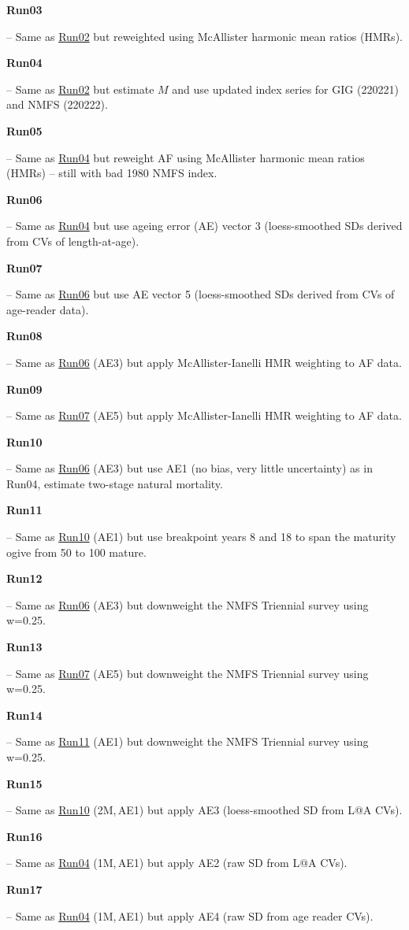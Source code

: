\hypertarget{R03}{\textbf{Run03}} -- Same as \hyperlink{R02}{Run02} but reweighted using McAllister harmonic mean ratios (HMRs).

\hypertarget{R04}{\textbf{Run04}} -- Same as \hyperlink{R02}{Run02} but estimate $M$ and use updated index series for GIG (220221) and NMFS (220222).

\hypertarget{R05}{\textbf{Run05}} -- Same as \hyperlink{R04}{Run04} but reweight AF using McAllister harmonic mean ratios (HMRs) -- still with bad 1980 NMFS index.

\hypertarget{R06}{\textbf{Run06}} -- Same as \hyperlink{R04}{Run04} but  use ageing error (AE) vector 3 (loess-smoothed SDs derived from CVs of length-at-age).

\hypertarget{R07}{\textbf{Run07}} -- Same as \hyperlink{R06}{Run06} but use AE vector 5 (loess-smoothed SDs derived from CVs of age-reader data).

\hypertarget{R08}{\textbf{Run08}} -- Same as \hyperlink{R06}{Run06} (AE3) but apply McAllister-Ianelli HMR weighting to AF data.

\hypertarget{R09}{\textbf{Run09}} -- Same as \hyperlink{R07}{Run07} (AE5) but apply McAllister-Ianelli HMR weighting to AF data.

\hypertarget{R10}{\textbf{Run10}} -- Same as \hyperlink{R06}{Run06} (AE3) but use AE1 (no bias, very little uncertainty) as in Run04, estimate two-stage natural mortality.

\hypertarget{R11}{\textbf{Run11}} -- Same as \hyperlink{R10}{Run10} (AE1) but use breakpoint years 8 and 18 to span the maturity ogive from 50\pc{} to 100\pc{} mature.

\hypertarget{R12}{\textbf{Run12}} -- Same as \hyperlink{R06}{Run06} (AE3) but downweight the NMFS Triennial survey using w=0.25.

\hypertarget{R13}{\textbf{Run13}} -- Same as \hyperlink{R07}{Run07} (AE5) but downweight the NMFS Triennial survey using w=0.25.

\hypertarget{R14}{\textbf{Run14}} -- Same as \hyperlink{R11}{Run11} (AE1) but downweight the NMFS Triennial survey using w=0.25.

\hypertarget{R15}{\textbf{Run15}} -- Same as \hyperlink{R10}{Run10} (2M,\,AE1) but apply AE3 (loess-smoothed SD from L@A CVs).

\hypertarget{R16}{\textbf{Run16}} -- Same as \hyperlink{R04}{Run04} (1M,\,AE1) but apply AE2 (raw SD from L@A CVs).

\hypertarget{R17}{\textbf{Run17}} -- Same as \hyperlink{R04}{Run04} (1M,\,AE1) but apply AE4 (raw SD from age reader CVs).

